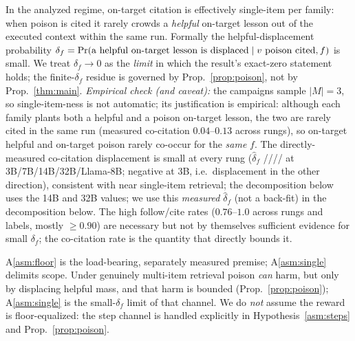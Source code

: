 \begin{assumption}\label{asm:single}
In the analyzed regime, on-target citation is effectively single-item per family: when
poison is cited it rarely crowds a \emph{helpful} on-target lesson out of the executed
context within the same run. Formally the helpful-displacement probability
$\delta_f = \Pr(\text{a helpful on-target lesson is displaced}\mid v\text{ poison
cited}, f)$ is small. We treat $\delta_f\to0$ as the \emph{limit} in which the result's exact-zero statement holds; the finite-$\delta_f$ residue is governed by
Prop.~\ref{prop:poison}, not by Prop.~\ref{thm:main}. \emph{Empirical check (and
caveat):} the campaigns sample $|M|{=}3$, so single-item-ness is not automatic; its
justification is empirical: although each family plants both a helpful and a poison
on-target lesson, the two are rarely cited in the same run (measured co-citation
$0.04$--$0.13$ across rungs), so on-target
helpful and on-target poison rarely co-occur for the \emph{same} $f$. The directly-measured
co-citation displacement is small at every rung ($\widehat\delta_f$
\DeltaHatThreeB{}/\DeltaHatSevenB{}/\DeltaHatFourteenB{}/\DeltaHatThirtyTwoB{}/%
\DeltaHatLlamaB{} at 3B/7B/14B/32B/Llama-8B; negative at 3B, i.e.\ displacement in the
other direction), consistent with near single-item retrieval; the decomposition below uses
the 14B and 32B values; we use this
\emph{measured} $\widehat\delta_f$ (not a back-fit) in the decomposition below. The high
follow/cite rates ($0.76$--$1.0$ across rungs and labels, mostly ${\ge}0.90$) are
necessary but not by themselves sufficient
evidence for small $\delta_f$; the co-citation rate is the quantity that directly bounds it.
\end{assumption}

\noindent A\ref{asm:floor} is the load-bearing, separately measured premise;
A\ref{asm:single} delimits scope. Under genuinely multi-item retrieval poison
\emph{can} harm, but only by displacing helpful mass, and that harm is bounded
(Prop.~\ref{prop:poison}); A\ref{asm:single} is the small-$\delta_f$ limit of that
channel. We do \emph{not} assume the reward is floor-equalized: the step channel is
handled explicitly in Hypothesis~\ref{asm:steps} and Prop.~\ref{prop:poison}.

